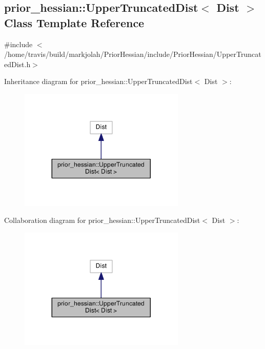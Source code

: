 \hypertarget{classprior__hessian_1_1UpperTruncatedDist}{}\subsection{prior\+\_\+hessian\+:\+:Upper\+Truncated\+Dist$<$ Dist $>$ Class Template Reference}
\label{classprior__hessian_1_1UpperTruncatedDist}


{\ttfamily \#include $<$/home/travis/build/markjolah/\+Prior\+Hessian/include/\+Prior\+Hessian/\+Upper\+Truncated\+Dist.\+h$>$}



Inheritance diagram for prior\+\_\+hessian\+:\+:Upper\+Truncated\+Dist$<$ Dist $>$\+:\nopagebreak
\begin{figure}[H]
\begin{center}
\leavevmode
\includegraphics[width=224pt]{classprior__hessian_1_1UpperTruncatedDist__inherit__graph}
\end{center}
\end{figure}


Collaboration diagram for prior\+\_\+hessian\+:\+:Upper\+Truncated\+Dist$<$ Dist $>$\+:\nopagebreak
\begin{figure}[H]
\begin{center}
\leavevmode
\includegraphics[width=224pt]{classprior__hessian_1_1UpperTruncatedDist__coll__graph}
\end{center}
\end{figure}
